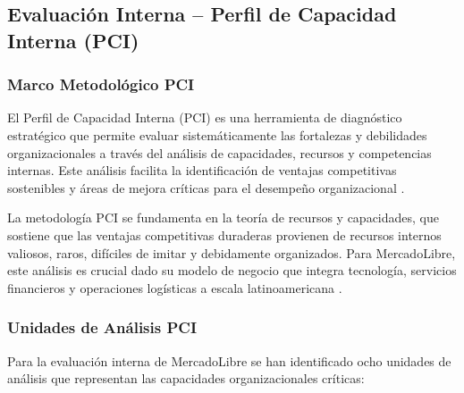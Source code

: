 \subsection{Evaluación Interna -- Perfil de Capacidad Interna (PCI)}
\label{sec:evaluacion_interna}

\subsubsection{Marco Metodológico PCI}

El Perfil de Capacidad Interna (PCI) es una herramienta de diagnóstico estratégico que permite evaluar sistemáticamente las fortalezas y debilidades organizacionales a través del análisis de capacidades, recursos y competencias internas. Este análisis facilita la identificación de ventajas competitivas sostenibles y áreas de mejora críticas para el desempeño organizacional \autocite{barney1991}.

La metodología PCI se fundamenta en la teoría de recursos y capacidades, que sostiene que las ventajas competitivas duraderas provienen de recursos internos valiosos, raros, difíciles de imitar y debidamente organizados. Para MercadoLibre, este análisis es crucial dado su modelo de negocio que integra tecnología, servicios financieros y operaciones logísticas a escala latinoamericana \autocite{teece2007}.

\subsubsection{Unidades de Análisis PCI}

Para la evaluación interna de MercadoLibre se han identificado ocho unidades de análisis que representan las capacidades organizacionales críticas:

